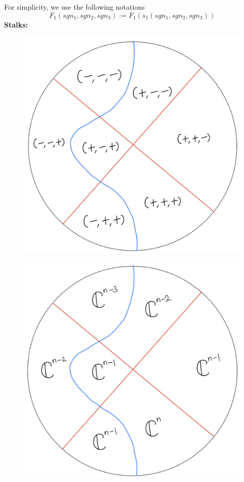 For simplicity, we use the following notations
\[
F_1(sgn_1,sgn_2,sgn_3):= F_1(s_1(sgn_1,sgn_2,sgn_3))
\]
\textbf{Stalks:}
\begin{figure}[H]
    \centering
    \includegraphics[scale = 0.45]{diagrams/lemma4/31.png}
    \caption{}
    \label{fig:your-label}
\end{figure}
\begin{figure}[H]
    \centering
    \includegraphics[scale = 0.45]{diagrams/cobord'4/32.png}
    \caption{}
    \label{fig:your-label}
\end{figure}
